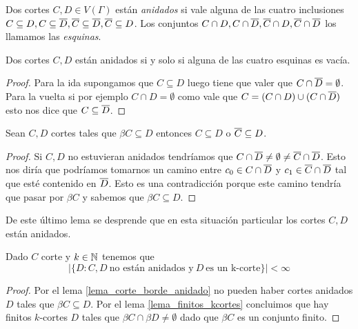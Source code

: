 \documentclass[tesis.tex]{subfiles}
\begin{document}
\begin{deff}
	Dos cortes $C,D \in V(\Gamma)$ están \emph{anidados} si vale alguna de las cuatro inclusiones $C \subseteq D, C \subseteq \overline D, \overline C \subseteq \overline D, \overline C \subseteq D$.
	Los conjuntos $C \cap D, C \cap \overline D, \overline C \cap D, \overline C \cap \overline D$ los llamamos las \emph{esquinas}.
\end{deff}

\begin{lema}
	Dos cortes $C,D$ están anidados si y solo si alguna de las cuatro esquinas es vacía.
\end{lema}
\begin{proof}
	Para la ida supongamos que $C \subseteq D$ luego tiene que valer que $C \cap \overline D = \emptyset$.
	Para la vuelta si por ejemplo $C \cap D = \emptyset$ como vale que $C = (C \cap D) \cup (C \cap \overline D)$ esto nos dice que $C \subseteq \overline D$.
	
\end{proof}

\begin{lema}\label{lema_corte_borde_anidado}
	Sean $C,D$ cortes tales que $\beta C \subseteq D$ entonces $C \subseteq D$ o $\overline C \subseteq D$.
\end{lema}
\begin{proof}
	Si $C,D$ no estuvieran anidados tendríamos que $C \cap \overline D \neq \emptyset \neq \overline C \cap \overline D$.
	Esto nos diría que podríamos tomarnos un camino entre $c_0 \in C \cap \overline D$ y $c_1 \in \overline C \cap \overline D$ tal que esté contenido en $\overline D$.
	Esto es una contradicción porque este camino tendría que pasar por $\beta C$ y sabemos que $\beta C \subseteq D$.
	
\end{proof}

De este último lema se desprende que en esta situación particular los cortes $C,D$ están anidados.

\begin{lema}
	Dado $C$ corte y $k \in \mathbb{N}$ tenemos que 
	\[
	| \{  D : C, D \ \text{no están anidados y} \ D \ \text{es un k-corte}   \} | < \infty
	\]
\end{lema}
\begin{proof}
	Por el lema \ref{lema_corte_borde_anidado} no pueden haber cortes anidados $D$ tales que $\beta C \subseteq D$.
	Por el lema \ref{lema_finitos_kcortes} concluimos que hay finitos $k$-cortes $D$ tales que $\beta C \cap \beta D \neq \emptyset$ dado que $\beta C$ es un conjunto finito.
				
\end{proof}
\end{document}
